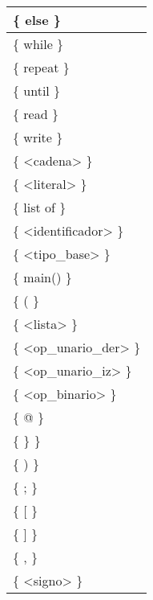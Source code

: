 \begin{center}
\begin{table}[!h]
\begin{tabular}{| l |}
    \{ else \} \\ \hline
    \{ while \} \\ \hline
    \{ repeat \} \\ \hline
    \{ until \} \\ \hline
    \{ read \} \\ \hline
    \{ write \} \\ \hline
    \{ <cadena> \} \\ \hline
    \{ <literal> \} \\ \hline
    \{ list of \} \\ \hline
    \{ <identificador> \} \\ \hline
    \{ <tipo_base> \} \\ \hline
    \{ main() \} \\ \hline
    \{ ( \} \\ \hline
    \{ <lista> \} \\ \hline
    \{ <op_unario_der> \} \\ \hline
    \{ <op_unario_iz> \} \\ \hline
    \{ <op_binario> \} \\ \hline
    \{ @ \} \\ \hline
    \{ \} \} \\ \hline
    \{ ) \} \\ \hline
    \{ ; \} \\ \hline
    \{ [ \} \\ \hline
    \{ ] \} \\ \hline
    \{ , \} \\ \hline
    \{ <signo> \} \\ \hline
  \end{tabular}
\end{table}
\end{center}
